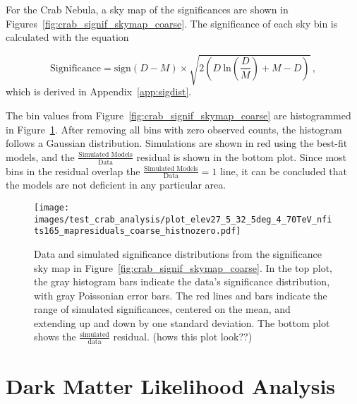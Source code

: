 For the Crab Nebula, a sky map of the significances are shown in Figures~\ref{fig:crab_signif_skymap_coarse}.
The significance of each sky bin is calculated with the equation

\begin{equation}\label{eqn:resmap_signif}
  \textrm{Significance} = \textrm{sign}(D-M) \times \sqrt{ 2 \left ( D \: \textrm{ln} \left ( \frac{D}{M} \right ) + M - D \right ) } \,,
\end{equation}
which is derived in Appendix~\ref{app:sigdist}.

The bin values from Figure~\ref{fig:crab_signif_skymap_coarse} are histogrammed in Figure~\ref{fig:crab_signif_distribution}.
After removing all bins with zero observed counts, the histogram follows a Gaussian distribution.
Simulations are shown in red using the best-fit models, and the $\frac{\textrm{Simulated Models}}{\textrm{Data}}$ residual is shown in the bottom plot.
Since most bins in the residual overlap the ${\frac{\textrm{Simulated Models}}{\textrm{Data}} = 1}$ line, it can be concluded that the models are not deficient in any particular area.

\begin{figure}[tb]
  \centering
  \texttt{[image: images/test\_crab\_analysis/plot\_elev27\_5\_32\_5deg\_4\_70TeV\_nfits165\_mapresiduals\_coarse\_histnozero.pdf]}
  \caption[Crab Residual Bin Distribution]{
    Data and simulated significance distributions from the significance sky map in Figure~\ref{fig:crab_signif_skymap_coarse}.
    In the top plot, the gray histogram bars indicate the data's significance distribution, with gray Poissonian error bars.
    The red lines and bars indicate the range of simulated significances, centered on the mean, and extending up and down by one standard deviation.
    The bottom plot shows the $\frac{\textrm{simulated}}{\textrm{data}}$ residual.
    {\color{red}(hows this plot look??)}
  }
  \label{fig:crab_signif_distribution}
\end{figure}
  
\FloatBarrier

\section{Dark Matter Likelihood Analysis}\label{sec:dmlike}
  
